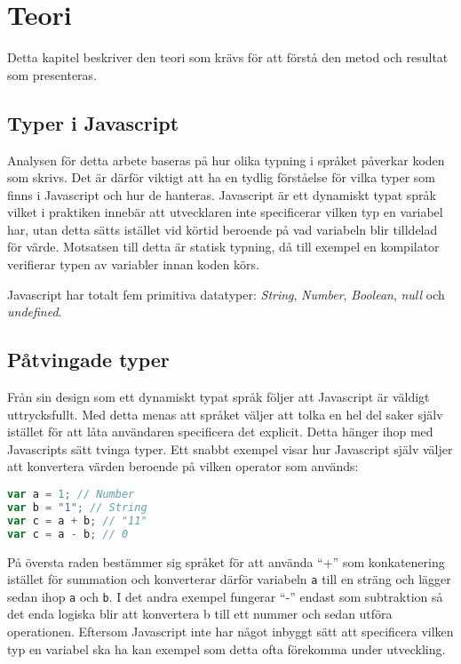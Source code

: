 \section{Teori}
\label{sec:alexander-theory}

Detta kapitel beskriver den teori som krävs för att förstå den metod och resultat som presenteras.

\subsection{Typer i Javascript}

Analysen för detta arbete baseras på hur olika typning i språket påverkar koden som skrivs. Det är därför viktigt att ha en tydlig förståelse för vilka typer som finns i Javascript och hur de hanteras. Javascript är ett dynamiskt typat språk vilket i praktiken innebär att utvecklaren inte specificerar vilken typ en variabel har, utan detta sätts istället vid körtid beroende på vad variabeln blir tilldelad för värde. Motsatsen till detta är statisk typning, då till exempel en kompilator verifierar typen av variabler innan koden körs.

Javascript har totalt fem primitiva datatyper: \textit{String}, \textit{Number}, \textit{Boolean}, \textit{null} och \textit{undefined}.

\subsection{Påtvingade typer}

Från sin design som ett dynamiskt typat språk följer att Javascript är väldigt uttrycksfullt. Med detta menas att språket väljer att tolka en hel del saker själv istället för att låta användaren specificera det explicit. Detta hänger ihop med Javascripts sätt tvinga typer. Ett snabbt exempel visar hur Javascript själv väljer att konvertera värden beroende på vilken operator som används:

\begin{lstlisting}[language=JavaScript]
var a = 1; // Number
var b = "1"; // String
var c = a + b; // "11"
var c = a - b; // 0
\end{lstlisting}




På översta raden bestämmer sig språket för att använda ``+'' som konkatenering istället för summation och konverterar därför variabeln \texttt{a} till en sträng och lägger sedan ihop \texttt{a} och \texttt{b}. I det andra exempel fungerar ``-'' endast som subtraktion så det enda logiska blir att konvertera b till ett nummer och sedan utföra operationen. Eftersom Javascript inte har något inbyggt sätt att specificera vilken typ en variabel ska ha kan exempel som detta ofta förekomma under utveckling.

